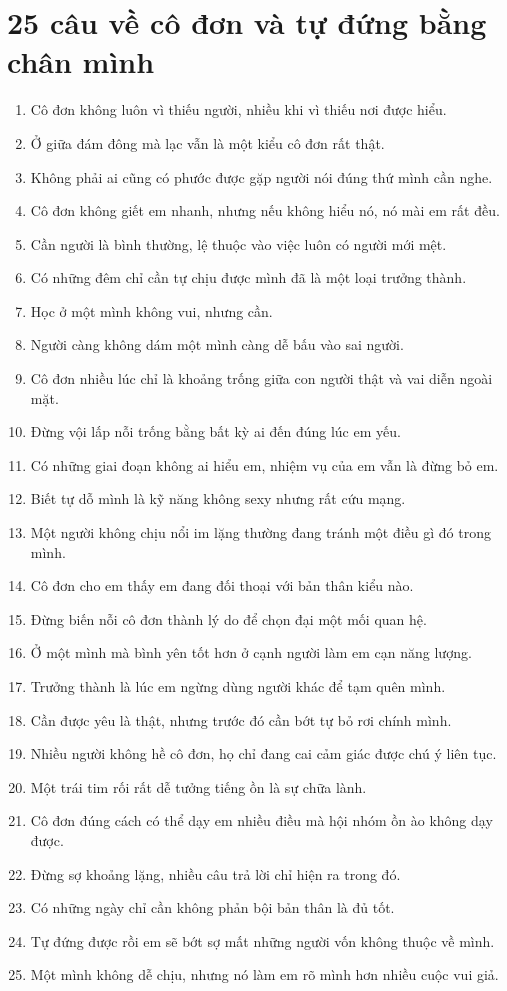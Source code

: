 \section{25 câu về cô đơn và tự đứng bằng chân mình}
\begin{enumerate}[leftmargin=*,resume]
\item Cô đơn không luôn vì thiếu người, nhiều khi vì thiếu nơi được hiểu.
\item Ở giữa đám đông mà lạc vẫn là một kiểu cô đơn rất thật.
\item Không phải ai cũng có phước được gặp người nói đúng thứ mình cần nghe.
\item Cô đơn không giết em nhanh, nhưng nếu không hiểu nó, nó mài em rất đều.
\item Cần người là bình thường, lệ thuộc vào việc luôn có người mới mệt.
\item Có những đêm chỉ cần tự chịu được mình đã là một loại trưởng thành.
\item Học ở một mình không vui, nhưng cần.
\item Người càng không dám một mình càng dễ bấu vào sai người.
\item Cô đơn nhiều lúc chỉ là khoảng trống giữa con người thật và vai diễn ngoài mặt.
\item Đừng vội lấp nỗi trống bằng bất kỳ ai đến đúng lúc em yếu.
\item Có những giai đoạn không ai hiểu em, nhiệm vụ của em vẫn là đừng bỏ em.
\item Biết tự dỗ mình là kỹ năng không sexy nhưng rất cứu mạng.
\item Một người không chịu nổi im lặng thường đang tránh một điều gì đó trong mình.
\item Cô đơn cho em thấy em đang đối thoại với bản thân kiểu nào.
\item Đừng biến nỗi cô đơn thành lý do để chọn đại một mối quan hệ.
\item Ở một mình mà bình yên tốt hơn ở cạnh người làm em cạn năng lượng.
\item Trưởng thành là lúc em ngừng dùng người khác để tạm quên mình.
\item Cần được yêu là thật, nhưng trước đó cần bớt tự bỏ rơi chính mình.
\item Nhiều người không hề cô đơn, họ chỉ đang cai cảm giác được chú ý liên tục.
\item Một trái tim rối rất dễ tưởng tiếng ồn là sự chữa lành.
\item Cô đơn đúng cách có thể dạy em nhiều điều mà hội nhóm ồn ào không dạy được.
\item Đừng sợ khoảng lặng, nhiều câu trả lời chỉ hiện ra trong đó.
\item Có những ngày chỉ cần không phản bội bản thân là đủ tốt.
\item Tự đứng được rồi em sẽ bớt sợ mất những người vốn không thuộc về mình.
\item Một mình không dễ chịu, nhưng nó làm em rõ mình hơn nhiều cuộc vui giả.
\end{enumerate}

